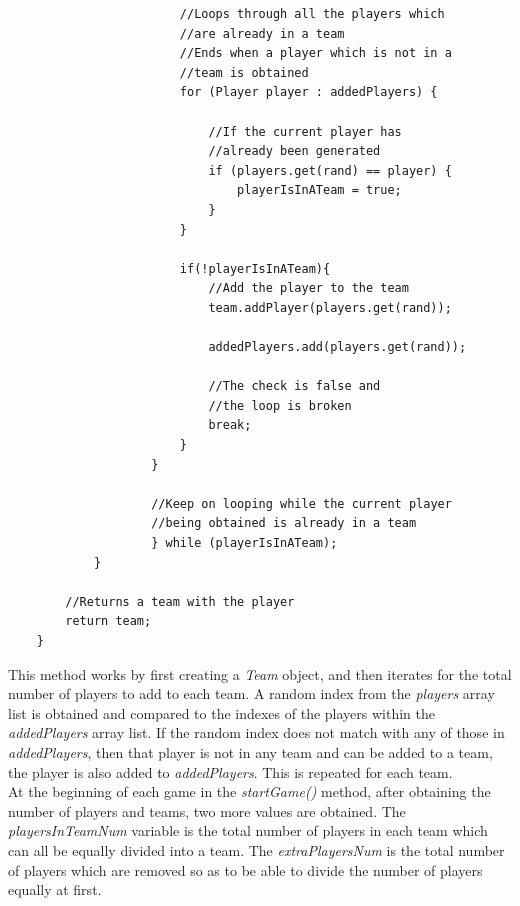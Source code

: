 \documentclass[a4paper,12pt]{extarticle}
\begin{document}
\begin{lstlisting}
                        //Loops through all the players which 
                        //are already in a team
                        //Ends when a player which is not in a 
                        //team is obtained
                        for (Player player : addedPlayers) {

                            //If the current player has 
                            //already been generated
                            if (players.get(rand) == player) {
                                playerIsInATeam = true;
                            }
                        }

                        if(!playerIsInATeam){
                            //Add the player to the team
                            team.addPlayer(players.get(rand));

                            addedPlayers.add(players.get(rand));

                            //The check is false and 
                            //the loop is broken
                            break;
                        }
                    }

                    //Keep on looping while the current player 
                    //being obtained is already in a team
                    } while (playerIsInATeam);
            }

        //Returns a team with the player
        return team;
    }
\end{lstlisting}
\vspace{4mm}

\noindent This method works by first creating a \textit{Team} object, and then iterates for the total number of players to add to each team. A random index from the \textit{players} array list is obtained and compared to the indexes of the players within the \textit{addedPlayers} array list. If the random index does not match with any of those in \textit{addedPlayers}, then that player is not in any team and can be added to a team, the player is also added to \textit{addedPlayers}. This is repeated for each team.\\


\noindent At the beginning of each game in the \textit{startGame()} method, after obtaining the number of players and teams, two more values are obtained. The \textit{playersInTeamNum} variable is the total number of players in each team which can all be equally divided into a team. The \textit{extraPlayersNum} is the total number of players which are removed so as to be able to divide the number of players equally at first. 
\end{document}
